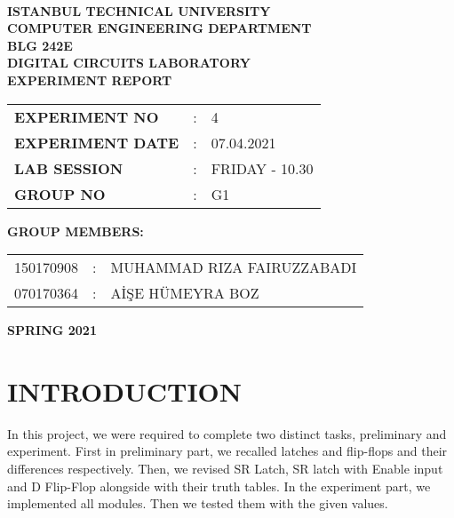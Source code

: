 \documentclass[pdftex,12pt,a4paper]{article}
\begin{document}
\begin{titlepage}
\begin{center}
\textbf{}\\
\textbf{\Large{ISTANBUL TECHNICAL UNIVERSITY}}\\
\vspace{0.5cm}
\textbf{\Large{COMPUTER ENGINEERING DEPARTMENT}}\\
\vspace{2cm}
\textbf{\Large{BLG 242E\\ DIGITAL CIRCUITS LABORATORY\\ EXPERIMENT REPORT}}\\
\vspace{2.8cm}
\begin{table}[ht]
\centering
\Large{
\begin{tabular}{lcl}
\textbf{EXPERIMENT NO}  & : & 4 \\
\textbf{EXPERIMENT DATE}  & : & 07.04.2021 \\
\textbf{LAB SESSION}  & : & FRIDAY - 10.30 \\
\textbf{GROUP NO}  & : & G1 \\
\end{tabular}}
\end{table}
\vspace{1cm}
\textbf{\Large{GROUP MEMBERS:}}\\
\begin{table}[ht]
\centering
\Large{
\begin{tabular}{rcl}
150170908  & : & MUHAMMAD RIZA FAIRUZZABADI \\
070170364  & : & AİŞE HÜMEYRA BOZ \\
\end{tabular}}
\end{table}
\vspace{2.8cm}
\textbf{\Large{SPRING 2021}}

\end{center}

\end{titlepage}

\thispagestyle{empty}
\setcounter{tocdepth}{4}
\tableofcontents
\clearpage

\setcounter{page}{1}






\section{INTRODUCTION}
In this project, we were required to complete two distinct tasks, preliminary and experiment. First in preliminary part, we recalled latches and flip-flops and their differences respectively. Then, we revised SR Latch, SR latch with Enable input and D Flip-Flop alongside with their truth tables. In the experiment part, we implemented all modules. Then we tested them with the given values. 
\end{document}
